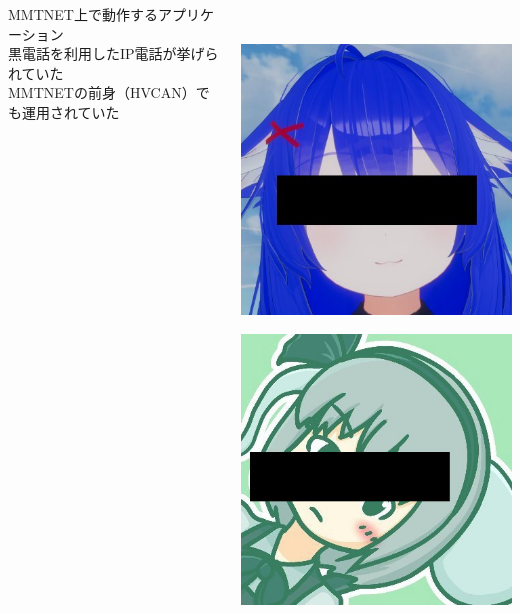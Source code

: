 \documentclass[
  lualatex,
  aspectratio=169,
  14pt
]{beamer}
\begin{document}
\begin{frame}
\begin{columns}[c]
\begin{column}[c]{.80\textwidth}
      MMTNET上で動作するアプリケーション\\
      \hspace{1.5\zw}黒電話を利用したIP電話が挙げられていた\\
      \hspace{1.5\zw}MMTNETの前身（HVCAN）でも運用されていた
    \end{column}
    \begin{column}{.17\textwidth}
      \centering
      \\~\\[-.75\baselineskip]
      \includegraphics[width=\linewidth]{./images/pepepper.jpg}

      \includegraphics[width=\linewidth]{./images/yude.jpg}


\end{column}
\end{columns}
\end{frame}
\end{document}

